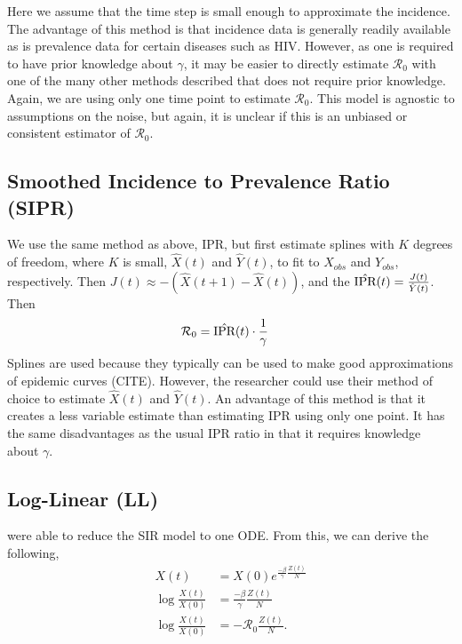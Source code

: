 \documentclass[12pt]{article}
\newcommand{\rr}{\ensuremath{\mathcal{R}_0}}
\begin{document}
Here we assume that the time step is small enough to approximate the incidence.  The advantage of this method is that incidence data is generally readily available as is prevalence data for certain diseases such as HIV.  However, as one is required to have prior knowledge about $\gamma$, it may be easier to directly estimate $\rr$ with one of the many other methods described that does not require  prior knowledge.  Again, we are using only one time point to estimate $\rr$.  This model is agnostic to assumptions on the noise, but again, it is unclear if this is an unbiased or consistent estimator of $\rr$.

\subsection{Smoothed Incidence to Prevalence Ratio (SIPR)}
We use the same method as above, IPR, but first estimate splines with $K$ degrees of freedom, where $K$ is small, $\hat{X}(t)$ and $\hat{Y}(t)$, to fit to $X_{obs}$ and $Y_{obs}$, respectively.  Then  $J(t) \approx -(\hat{X}(t+1) - \hat{X}(t))$, and the $\hat{\textnormal{IPR}}(t) = \frac{J(t)}{\hat{Y}(t)}$.  Then
\begin{align*}
\rr &= \hat{\textnormal{IPR}}(t) \cdot \frac{1}{\gamma}
\end{align*}
Splines are used because they typically can be used to make good approximations of epidemic curves (CITE).  However, the researcher could use their method of choice to estimate $\hat{X}(t)$ and $\hat{Y}(t)$.  An advantage of this method is that it creates a less variable estimate than estimating IPR using only one point.  It has the same disadvantages as the usual IPR ratio in that it requires knowledge about $\gamma$.

\subsection{Log-Linear (LL)}
\cite{harko2014exact} were able to reduce the SIR model to one ODE.  From this, we can derive the following,
\begin{align}
  X(t) &=  X(0) e^{\frac{-\beta}{\gamma}\frac{Z(t)}{N}} \nonumber\\
  \log \frac{X(t)}{X(0)} &=  \frac{-\beta }{\gamma}\frac{Z(t)}{N} \nonumber\\
  \log \frac{X(t)}{X(0)} &=  -\rr \frac{Z(t)}{N}. \label{eq:harko_lin}
\end{align}
\end{document}
